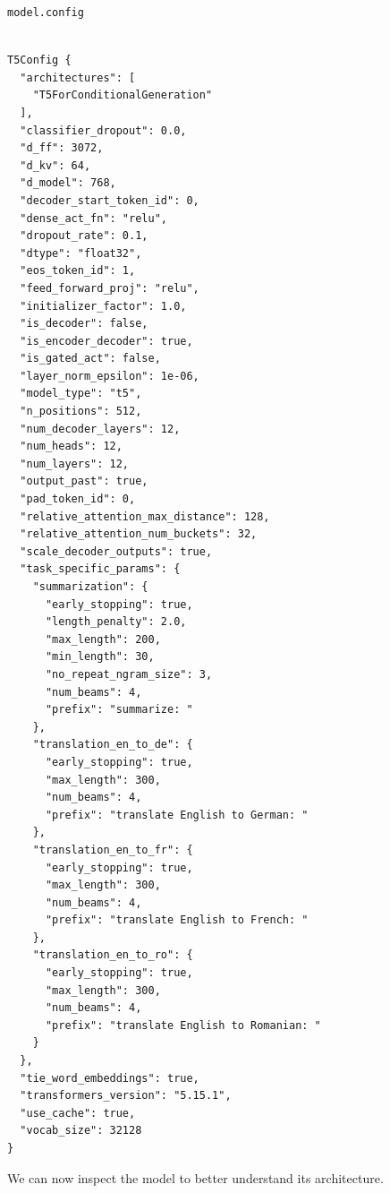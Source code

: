 \documentclass[../labs.tex]{subfiles}
\begin{document}
\begin{lstlisting}[language=Python,basicstyle=\ttfamily\scriptsize,breaklines=true,breakatwhitespace=false,columns=fullflexible,keepspaces=true,numbers=none]
model.config
\end{lstlisting}

\hypertarget{res:lab02-text-01-t5-ipynb-41-961f983b042d}{}

\begin{lstlisting}[basicstyle=\ttfamily\scriptsize,breaklines=true,breakatwhitespace=false,columns=fullflexible,keepspaces=true]

T5Config {
  "architectures": [
    "T5ForConditionalGeneration"
  ],
  "classifier_dropout": 0.0,
  "d_ff": 3072,
  "d_kv": 64,
  "d_model": 768,
  "decoder_start_token_id": 0,
  "dense_act_fn": "relu",
  "dropout_rate": 0.1,
  "dtype": "float32",
  "eos_token_id": 1,
  "feed_forward_proj": "relu",
  "initializer_factor": 1.0,
  "is_decoder": false,
  "is_encoder_decoder": true,
  "is_gated_act": false,
  "layer_norm_epsilon": 1e-06,
  "model_type": "t5",
  "n_positions": 512,
  "num_decoder_layers": 12,
  "num_heads": 12,
  "num_layers": 12,
  "output_past": true,
  "pad_token_id": 0,
  "relative_attention_max_distance": 128,
  "relative_attention_num_buckets": 32,
  "scale_decoder_outputs": true,
  "task_specific_params": {
    "summarization": {
      "early_stopping": true,
      "length_penalty": 2.0,
      "max_length": 200,
      "min_length": 30,
      "no_repeat_ngram_size": 3,
      "num_beams": 4,
      "prefix": "summarize: "
    },
    "translation_en_to_de": {
      "early_stopping": true,
      "max_length": 300,
      "num_beams": 4,
      "prefix": "translate English to German: "
    },
    "translation_en_to_fr": {
      "early_stopping": true,
      "max_length": 300,
      "num_beams": 4,
      "prefix": "translate English to French: "
    },
    "translation_en_to_ro": {
      "early_stopping": true,
      "max_length": 300,
      "num_beams": 4,
      "prefix": "translate English to Romanian: "
    }
  },
  "tie_word_embeddings": true,
  "transformers_version": "5.15.1",
  "use_cache": true,
  "vocab_size": 32128
}

\end{lstlisting}



\noindent We can now inspect the model to better understand its architecture.
\end{document}
